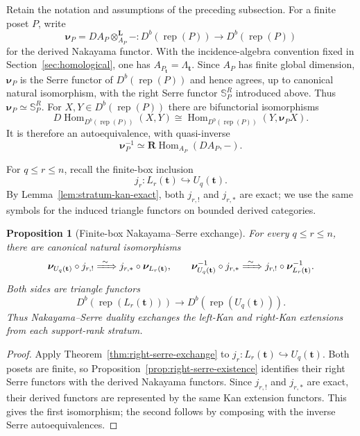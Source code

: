 \documentclass[10pt,a4paper]{amsart}
\newtheorem{proposition}[theorem]{Proposition}
\newcommand{\Rep}{\operatorname{rep}}
\newcommand{\Hom}{\operatorname{Hom}}
\begin{document}
Retain the notation and assumptions of the preceding subsection.  For a
finite poset $P$, write
\[
\boldsymbol\nu_P
=
DA_P\otimes_{A_P}^{\mathbf L}-
:
D^b(\Rep(P))\longrightarrow D^b(\Rep(P))
\]
for the derived Nakayama functor.  With the incidence-algebra convention fixed
in Section~\ref{sec:homological}, one has $A_{P_{\mathbf t}}=\Lambda_{\mathbf t}$.
Since $A_P$ has finite global dimension, $\boldsymbol\nu_P$ is the Serre
functor of $D^b(\Rep(P))$ and hence agrees, up to canonical natural
isomorphism, with the right Serre functor $\mathbb S_P^R$ introduced above.
Thus $\boldsymbol\nu_P\simeq\mathbb S_P^R$.  For $X,Y\in D^b(\Rep(P))$
there are bifunctorial isomorphisms
\[
D\Hom_{D^b(\Rep(P))}(X,Y)
\cong
\Hom_{D^b(\Rep(P))}(Y,\boldsymbol\nu_P X).
\]
It is therefore an autoequivalence, with quasi-inverse
\[
\boldsymbol\nu_P^{-1}
\simeq
\mathbf R\Hom_{A_P}(DA_P,-).
\]

For $q\le r\le n$, recall the finite-box inclusion
\[
j_r:L_r(\mathbf t)\hookrightarrow U_q(\mathbf t).
\]
By Lemma~\ref{lem:stratum-kan-exact}, both $j_{r,!}$ and $j_{r,*}$ are exact;
we use the same symbols for the induced triangle functors on bounded derived
categories.

\begin{proposition}[Finite-box Nakayama--Serre exchange]\label{prop:nakayama-kan-exchange}
For every $q\le r\le n$, there are canonical natural isomorphisms
\begin{equation}\label{eq:nakayama-kan-exchange}
\boldsymbol\nu_{U_q(\mathbf t)}\circ j_{r,!}
\xRightarrow{\ \sim\ }
j_{r,*}\circ\boldsymbol\nu_{L_r(\mathbf t)},
\qquad
\boldsymbol\nu_{U_q(\mathbf t)}^{-1}\circ j_{r,*}
\xRightarrow{\ \sim\ }
j_{r,!}\circ\boldsymbol\nu_{L_r(\mathbf t)}^{-1}.
\end{equation}
Both sides are triangle functors
\[
D^b\!\left(\Rep(L_r(\mathbf t))\right)
\longrightarrow
D^b\!\left(\Rep(U_q(\mathbf t))\right).
\]
Thus Nakayama--Serre duality exchanges the left-Kan and right-Kan extensions
from each support-rank stratum.
\end{proposition}

\begin{proof}
Apply Theorem~\ref{thm:right-serre-exchange} to
$j_r:L_r(\mathbf t)\hookrightarrow U_q(\mathbf t)$.  Both posets are finite,
so Proposition~\ref{prop:right-serre-existence} identifies their right Serre
functors with the derived Nakayama functors.  Since $j_{r,!}$ and $j_{r,*}$
are exact, their derived functors are represented by the same Kan extension
functors.  This gives the first isomorphism; the second follows by composing
with the inverse Serre autoequivalences.
\end{proof}
\end{document}

